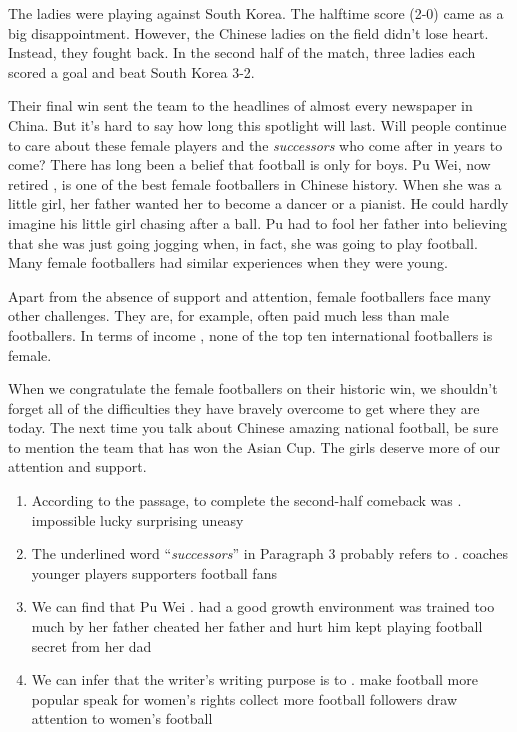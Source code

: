 \documentclass{ExamJHSEngl}
\begin{document}
The ladies were playing against South Korea. The halftime score (2-0) came as a big disappointment. However, the Chinese ladies on the field didn't lose heart. Instead, they fought back. In the second half of the match, three ladies each scored a goal and beat South Korea 3-2.

Their final win sent the team to the headlines of almost every newspaper in China. But it's hard to say how long this spotlight    will last. Will people continue to care about these female players and the \emph{successors} who come after in years to come? There has long been a belief that football is only for boys. Pu Wei, now retired   , is one of the best female footballers in Chinese history. When she was a little girl, her father wanted her to become a dancer or a pianist. He could hardly imagine his little girl chasing after a ball. Pu had to fool her father into believing that she was just going jogging when, in fact, she was going to play football. Many female footballers had similar experiences when they were young.

Apart from the absence of support and attention, female footballers face many other challenges. They are, for example, often paid much less than male footballers. In terms of income  , none of the top ten international footballers is female.

When we congratulate the female footballers on their historic win, we shouldn't forget all of the difficulties they have bravely overcome to get where they are today. The next time you talk about Chinese amazing national football, be sure to mention the team that has won the Asian Cup. The girls deserve   more of our attention and support.

\begin{enumerate}[resume,ref={\arabic*},labelsep=-0.1em]

\item[\choice{C}] According to the passage, to complete the second-half comeback was \blank.
\options
  {impossible}
  {lucky}
  {surprising}
  {uneasy}

\item[\choice{B}] The underlined word “\emph{successors}” in Paragraph 3 probably refers to \blank.
\options
  {coaches}
  {younger players}
  {supporters}
  {football fans}

\item[\choice{D}] We can find that Pu Wei \blank.
\options
  {had a good growth environment}
  {was trained too much by her father}
  {cheated her father and hurt him}
  {kept playing football secret from her dad}

\item[\choice{D}] We can infer that the writer's writing purpose is to \blank.
\options
  {make football more popular}
  {speak for women's rights}
  {collect more football followers}
  {draw attention to women's football}
\end{enumerate}
\end{document}
